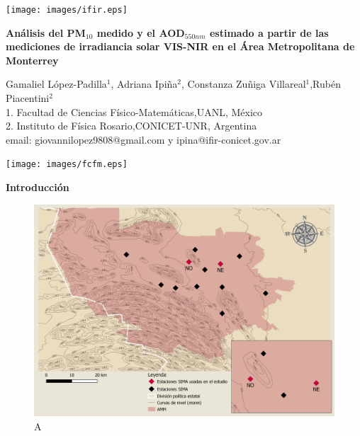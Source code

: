 \documentclass{article}
\begin{document}
\vspace*{-2cm}
\changefontsizes{14pt}
\hspace*{-1cm}
\begin{minipage}{0.2\linewidth}
\vspace{0.7cm}
\vspace*{-0.15cm}
\texttt{[image: images/ifir.eps]}
\end{minipage}
\vspace*{-0.4cm}
\begin{minipage}{0.6\linewidth}
\vspace*{0.7cm}
\begin{center}
\changefontsizes{15pt}
\hspace*{-0.1cm}
\textbf{\textcolor{title}{Análisis del PM$_{10}$ medido y el AOD$_{550nm}$ estimado a partir de las mediciones de irradiancia solar VIS-NIR en el Área Metropolitana de Monterrey}}
\end{center}
\vspace{-1cm}
\begin{center}
\changefontsizes{11pt}
Gamaliel López-Padilla$^1$, Adriana Ipiña$^{2}$, Constanza Zuñiga Villareal$^{1}$,Rubén Piacentini$^{2}$\\
1. Facultad de Ciencias Físico-Matemáticas,UANL, México\\
2. Instituto de Física Rosario,CONICET-UNR, Argentina\\
email: giovannilopez9808@gmail.com y ipina@ifir-conicet.gov.ar
\end{center}
\end{minipage}
\begin{minipage}{0.2\linewidth}
\hspace*{0.2cm}
\texttt{[image: images/fcfm.eps]}
\end{minipage}
\vspace{0.2cm}
\changefontsizes{12pt}
\begin{center}
\begin{shaded}
\textbf{\textcolor{ver}{Introducción}}
\end{shaded}
\end{center}
\begin{minipage}{0.47\linewidth}
\begin{figure}[H]
\centering
\includegraphics[scale=0.375]{images/AMM10.png}
\caption{A}
\end{figure}
\end{minipage}
\end{document}
